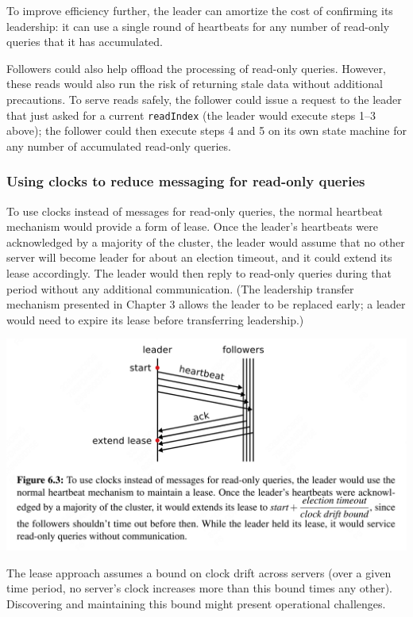 \documentclass[11pt]{article}
\begin{document}
To improve efficiency further, the leader can amortize the cost of confirming its leadership: it can
use a single round of heartbeats for any number of read-only queries that it has accumulated.

Followers could also help offload the processing of read-only queries. However, these reads would also
run the risk of returning stale data without additional precautions. To serve reads safely, the
follower could issue a request to the leader that just asked for a current \texttt{readIndex} (the leader would
execute steps 1–3 above); the follower could then execute steps 4 and 5 on its own state machine for
any number of accumulated read-only queries.
\subsubsection{Using clocks to reduce messaging for read-only queries}
\label{sec:org8aeafc9}
To use clocks instead of messages for read-only queries, the normal heartbeat mechanism would provide
a form of lease. Once the leader’s heartbeats were acknowledged by a majority of the cluster, the
leader would assume that no other server will become leader for about an election timeout, and it
could extend its lease accordingly. The leader would then reply to read-only queries during that
period without any additional communication.
(The leadership transfer mechanism presented in Chapter 3 allows the leader to be replaced early; a
leader would need to expire its lease before transferring leadership.)
\begin{center}
\includegraphics[width=.99\textwidth]{../../images/papers/22.png}
\label{}
\end{center}

The lease approach assumes a bound on clock drift across servers (over a given time period, no
server's clock increases more than this bound times any other). Discovering and maintaining this bound
might present operational challenges.
\end{document}
